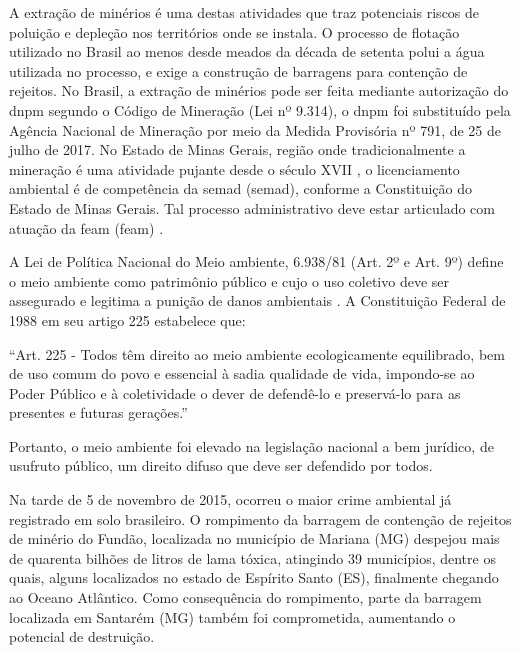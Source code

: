 \documentclass[
article,			%
11pt,				%
oneside,			%
a4paper,			%
english,			%
brazil,				%
sumario=tradicional
]{abntex2}
\begin{document}
	A extração de minérios é uma destas atividades que traz potenciais riscos de poluição e depleção nos territórios onde se instala. O processo de flotação utilizado no Brasil ao menos desde meados da década de setenta polui a água utilizada no processo, e exige a construção de barragens para contenção de rejeitos. No Brasil, a extração  de minérios pode ser feita mediante autorização do \glsdesc{dnpm} segundo o Código de Mineração (Lei nº 9.314), o \gls{dnpm} foi substituído pela Agência Nacional de Mineração por meio da Medida Provisória nº 791, de 25 de julho de 2017.  No Estado de Minas Gerais, região onde tradicionalmente a mineração é uma atividade pujante desde o século XVII , o licenciamento ambiental é de competência da \glsdesc{semad} (\gls{semad}), conforme a Constituição do Estado de Minas Gerais. Tal processo administrativo deve estar articulado com atuação  da \glsdesc{feam} (\gls{feam}) \cite{brasil1989a}.
	
	A Lei de Política Nacional do Meio ambiente, 6.938/81 (Art. 2º e Art. 9º) define o meio ambiente como patrimônio público e cujo o uso coletivo deve ser assegurado e legitima a punição de danos ambientais \cite{brasil1981a}. A Constituição Federal de 1988 em seu artigo 225 estabelece que:
	
	\begin{citacao}
		``Art. 225 - Todos têm direito ao meio ambiente ecologicamente equilibrado, bem de uso comum do povo e essencial à sadia qualidade de vida, impondo-se ao Poder Público e à coletividade o dever de defendê-lo e preservá-lo para as presentes e futuras gerações.'' \cite{brasil1988a}
	\end{citacao}
	
	Portanto, o meio ambiente foi elevado na legislação nacional a bem jurídico,  de usufruto público, um direito difuso que deve ser defendido por todos. 
	 
	Na tarde de 5 de novembro de 2015, ocorreu o maior crime ambiental já registrado em solo brasileiro. O rompimento da barragem  de contenção de rejeitos de minério do Fundão, localizada no município de Mariana (MG) despejou mais de quarenta bilhões de litros de lama tóxica,  atingindo 39 municípios, dentre os quais, alguns localizados no estado de Espírito Santo (ES), finalmente chegando ao Oceano Atlântico. Como consequência do rompimento, parte da barragem localizada em Santarém (MG) também foi comprometida, aumentando o potencial de destruição.
	
\end{document}
